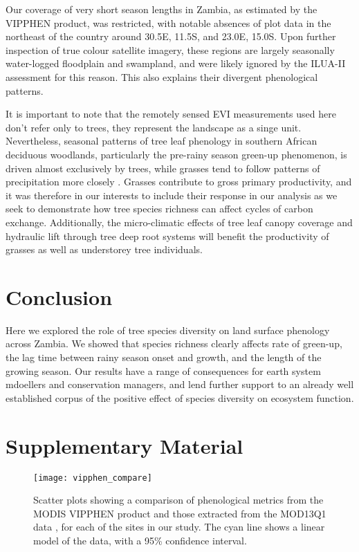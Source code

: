 \documentclass[11pt,a4paper]{article}
\newcommand{\beginsupplement}{%
	\setcounter{table}{0}
	\renewcommand{\thetable}{S\arabic{table}}%
	\setcounter{figure}{0}
	\renewcommand{\thefigure}{S\arabic{figure}}%
	}
\begin{document}
Our coverage of very short season lengths in Zambia, as estimated by the VIPPHEN product, was restricted, with notable absences of plot data in the northeast of the country around 30.5\textdegree{}E, 11.5\textdegree{}S, and 23.0\textdegree{}E, 15.0\textdegree{}S. Upon further inspection of true colour satellite imagery, these regions are largely seasonally water-logged floodplain and swampland, and were likely ignored by the ILUA-II assessment for this reason. This also explains their divergent phenological patterns. 

It is important to note that the remotely sensed EVI measurements used here don't refer only to trees, they represent the landscape as a singe unit. Nevertheless, seasonal patterns of tree leaf phenology in southern African deciduous woodlands, particularly the pre-rainy season green-up phenomenon, is driven almost exclusively by trees, while grasses tend to follow patterns of precipitation more closely \citep{}. Grasses contribute to gross primary productivity, and it was therefore in our interests to include their response in our analysis as we seek to demonstrate how tree species richness can affect cycles of carbon exchange. Additionally, the micro-climatic effects of tree leaf canopy coverage and hydraulic lift through tree deep root systems will benefit the productivity of grasses as well as understorey tree individuals.

\section{Conclusion}

Here we explored the role of tree species diversity on land surface phenology across Zambia. We showed that species richness clearly affects rate of green-up, the lag time between rainy season onset and growth, and the length of the growing season. Our results have a range of consequences for earth system mdoellers and conservation managers, and lend further support to an already well established corpus of the positive effect of species diversity on ecosystem function.

\printbibliography

\section{Supplementary Material}
\beginsupplement

\begin{figure}[H]
\centering
	\texttt{[image: vipphen\_compare]}
	\caption{Scatter plots showing a comparison of phenological metrics from the MODIS VIPPHEN product \citep{VIPPHEN} and those extracted from the MOD13Q1 data \citep{MOD13Q1}, for each of the sites in our study. The cyan line shows a linear model of the data, with a 95\% confidence interval.}
	\label{vipphen_compare}
\end{figure}
\end{document}

